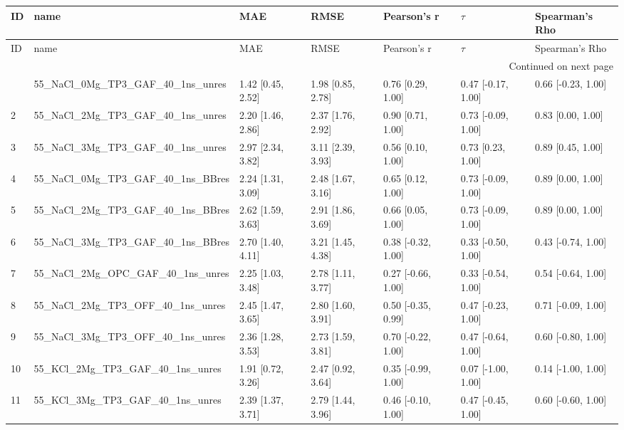 \documentclass{article}
\begin{document}
\begin{center}
\scriptsize
\begin{longtable}{|p{1cm}|p{5cm}|p{2.5cm}|p{2.5cm}|p{2.5cm}|p{2.5cm}|p{2.5cm}|}
\toprule
ID & name & MAE & RMSE & Pearson's r & $\tau$ & Spearman's Rho \\
\midrule
\endfirsthead
\toprule
ID & name & MAE & RMSE & Pearson's r & $\tau$ & Spearman's Rho \\
\midrule
\endhead
\midrule
\multicolumn{7}{r}{Continued on next page} \\
\midrule
\endfoot
\bottomrule
\endlastfoot
1 & 55\_NaCl\_0Mg\_TP3\_GAF\_40\_1ns\_unres & 1.42 [0.45, 2.52] & 1.98 [0.85, 2.78] & 0.76 [0.29, 1.00] & 0.47 [-0.17, 1.00] & 0.66 [-0.23, 1.00] \\
2 & 55\_NaCl\_2Mg\_TP3\_GAF\_40\_1ns\_unres & 2.20 [1.46, 2.86] & 2.37 [1.76, 2.92] & 0.90 [0.71, 1.00] & 0.73 [-0.09, 1.00] & 0.83 [0.00, 1.00] \\
3 & 55\_NaCl\_3Mg\_TP3\_GAF\_40\_1ns\_unres & 2.97 [2.34, 3.82] & 3.11 [2.39, 3.93] & 0.56 [0.10, 1.00] & 0.73 [0.23, 1.00] & 0.89 [0.45, 1.00] \\
4 & 55\_NaCl\_0Mg\_TP3\_GAF\_40\_1ns\_BBres & 2.24 [1.31, 3.09] & 2.48 [1.67, 3.16] & 0.65 [0.12, 1.00] & 0.73 [-0.09, 1.00] & 0.89 [0.00, 1.00] \\
5 & 55\_NaCl\_2Mg\_TP3\_GAF\_40\_1ns\_BBres & 2.62 [1.59, 3.63] & 2.91 [1.86, 3.69] & 0.66 [0.05, 1.00] & 0.73 [-0.09, 1.00] & 0.89 [0.00, 1.00] \\
6 & 55\_NaCl\_3Mg\_TP3\_GAF\_40\_1ns\_BBres & 2.70 [1.40, 4.11] & 3.21 [1.45, 4.38] & 0.38 [-0.32, 1.00] & 0.33 [-0.50, 1.00] & 0.43 [-0.74, 1.00] \\
7 & 55\_NaCl\_2Mg\_OPC\_GAF\_40\_1ns\_unres & 2.25 [1.03, 3.48] & 2.78 [1.11, 3.77] & 0.27 [-0.66, 1.00] & 0.33 [-0.54, 1.00] & 0.54 [-0.64, 1.00] \\
8 & 55\_NaCl\_2Mg\_TP3\_OFF\_40\_1ns\_unres & 2.45 [1.47, 3.65] & 2.80 [1.60, 3.91] & 0.50 [-0.35, 0.99] & 0.47 [-0.23, 1.00] & 0.71 [-0.09, 1.00] \\
9 & 55\_NaCl\_3Mg\_TP3\_OFF\_40\_1ns\_unres & 2.36 [1.28, 3.53] & 2.73 [1.59, 3.81] & 0.70 [-0.22, 1.00] & 0.47 [-0.64, 1.00] & 0.60 [-0.80, 1.00] \\
10 & 55\_KCl\_2Mg\_TP3\_GAF\_40\_1ns\_unres & 1.91 [0.72, 3.26] & 2.47 [0.92, 3.64] & 0.35 [-0.99, 1.00] & 0.07 [-1.00, 1.00] & 0.14 [-1.00, 1.00] \\
11 & 55\_KCl\_3Mg\_TP3\_GAF\_40\_1ns\_unres & 2.39 [1.37, 3.71] & 2.79 [1.44, 3.96] & 0.46 [-0.10, 1.00] & 0.47 [-0.45, 1.00] & 0.60 [-0.60, 1.00] \\

\end{longtable}
\end{center}
\end{document}
